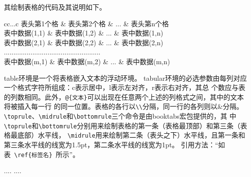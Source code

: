 \documentclass{cumcmthesis}
\begin{document}
其绘制表格的代码及其说明如下。
\begin{tcode}
\begin{table}[!htbp]
\caption[标签名]{中文标题}
\begin{tabular}{cc...c}
\toprule[1.5pt]
表头第1个格   & 表头第2个格   & ... & 表头第n个格  \\
\midrule[1pt]
表中数据(1,1) & 表中数据(1,2) & ... & 表中数据(1,n)\\
表中数据(2,1) & 表中数据(2,2) & ... & 表中数据(2,n)\\
...................................................\\
表中数据(m,1) & 表中数据(m,2) & ... & 表中数据(m,n)\\
\bottomrule[1.5pt]
\end{tabular}
\end{table}
\end{tcode}

\bigskip
table环境是一个将表格嵌入文本的浮动环境。
tabular环境的必选参数由每列对应一个格式字符所组成：c表示居中，l表示左对齐，r表示右对齐，其总
个数应与表的列数相同。此外，\verb|@{文本}|可以出现在任意两个上述的列格式之间，其中的文本将被插入每一行
的同一位置。表格的各行以\verb|\\|分隔，同一行的各列则以\&分隔。
\verb|\toprule|、\verb|\midrule|和\verb|\bottomrule|三个命令是由booktabs宏包提供的，其
中\verb|\toprule|和\verb|\bottomrule|分别用来绘制表格的第一条（表格最顶部）和第三条（表格最底部）水平线，
\verb|\midrule|用来绘制第二条（表头之下）水平线，且第一条和第三条水平线的线宽为1.5pt，第二条水平线的线宽为1pt。
引用方法：“如表~\verb|\ref{标签名}|~所示”。


\begin{thebibliography}{9}%
  ....
  ....
\end{thebibliography}
\end{document}

